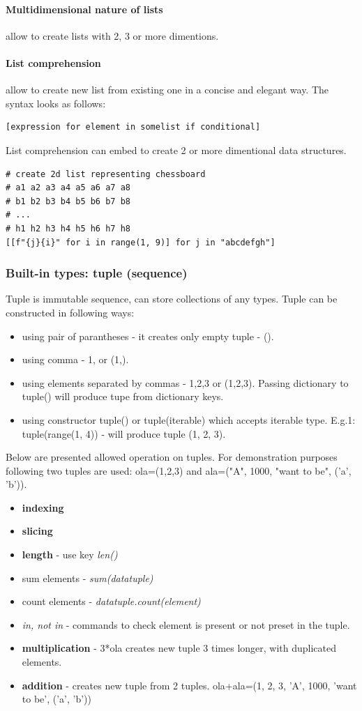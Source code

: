 \documentclass{article}
\begin{document}
	\paragraph{Multidimensional nature of lists} allow to create lists with 2, 3 or more dimentions.
	\paragraph{List comprehension} allow to create new list from existing one in a concise and elegant way. The syntax looks as follows:
	\begin{lstlisting}[style=pystyle]
[expression for element in somelist if conditional]
	\end{lstlisting}
	List comprehension can embed to create 2 or more dimentional data structures.
	\begin{lstlisting}[style=pystyle]
# create 2d list representing chessboard
# a1 a2 a3 a4 a5 a6 a7 a8
# b1 b2 b3 b4 b5 b6 b7 b8
# ...
# h1 h2 h3 h4 h5 h6 h7 h8
[[f"{j}{i}" for i in range(1, 9)] for j in "abcdefgh"]
	\end{lstlisting}


	\subsubsection{Built-in types: tuple (sequence)}
	Tuple is immutable sequence, can store collections of any types. Tuple can be constructed in following ways:
	\begin{itemize}
	\item using pair of parantheses - it creates only empty tuple - ().
	\item using comma - 1, or (1,).
	\item using elements separated by commas - 1,2,3 or (1,2,3). Passing dictionary to tuple() will produce tupe from dictionary keys.
	\item \raggedright using constructor tuple() or tuple(iterable) which accepts iterable type. \linebreak E.g.1: tuple(range(1, 4)) - will produce tuple (1, 2, 3).
	\end{itemize}
Below are presented allowed operation on tuples. For demonstration purposes following two tuples are used: ola=(1,2,3) and ala=("A", 1000, "want to be", ('a', 'b')).
	\begin{itemize}
	\item \textbf{indexing}
	\item \textbf{slicing}
	\item \textbf{length} - use key \textit{len()}
	\item sum elements - \textit{sum(datatuple)}
	\item count elements - \textit{datatuple.count(element)}
	\item \textit{in, not in} - commands to check element is present or not preset in the tuple.
	\item \textbf{multiplication} - 3*ola creates new tuple 3 times longer, with duplicated elements.
	\item \textbf{addition} - creates new tuple from 2 tuples. ola+ala=(1, 2, 3, 'A', 1000, 'want to be', ('a', 'b'))	
	\end{itemize}
\end{document}
